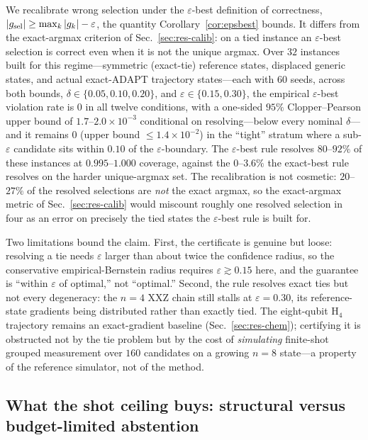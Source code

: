 \documentclass[aps,pra,reprint,superscriptaddress,nofootinbib,floatfix]{revtex4-2}
\begin{document}
We recalibrate wrong selection under the $\varepsilon$-best definition of correctness, $|g_{\rm sel}|\ge\max_k|g_k|-\varepsilon$, the quantity Corollary~\ref{cor:epsbest} bounds. It differs from the exact-argmax criterion of Sec.~\ref{sec:res-calib}: on a tied instance an $\varepsilon$-best selection is correct even when it is not the unique argmax. Over $32$ instances built for this regime---symmetric (exact-tie) reference states, displaced generic states, and actual exact-ADAPT trajectory states---each with $60$ seeds, across both bounds, $\delta\in\{0.05,0.10,0.20\}$, and $\varepsilon\in\{0.15,0.30\}$, the empirical $\varepsilon$-best violation rate is $0$ in all twelve conditions, with a one-sided $95\%$ Clopper--Pearson upper bound of $1.7$--$2.0\times10^{-3}$ conditional on resolving---below every nominal $\delta$---and it remains $0$ (upper bound $\le1.4\times10^{-2}$) in the ``tight'' stratum where a sub-$\varepsilon$ candidate sits within $0.10$ of the $\varepsilon$-boundary. The $\varepsilon$-best rule resolves $80$--$92\%$ of these instances at $0.995$--$1.000$ coverage, against the $0$--$3.6\%$ the exact-best rule resolves on the harder unique-argmax set. The recalibration is not cosmetic: $20$--$27\%$ of the resolved selections are \emph{not} the exact argmax, so the exact-argmax metric of Sec.~\ref{sec:res-calib} would miscount roughly one resolved selection in four as an error on precisely the tied states the $\varepsilon$-best rule is built for.

Two limitations bound the claim. First, the certificate is genuine but loose: resolving a tie needs $\varepsilon$ larger than about twice the confidence radius, so the conservative empirical-Bernstein radius requires $\varepsilon\gtrsim0.15$ here, and the guarantee is ``within $\varepsilon$ of optimal,'' not ``optimal.'' Second, the rule resolves exact ties but not every degeneracy: the $n=4$ XXZ chain still stalls at $\varepsilon=0.30$, its reference-state gradients being distributed rather than exactly tied. The eight-qubit H$_4$ trajectory remains an exact-gradient baseline (Sec.~\ref{sec:res-chem}); certifying it is obstructed not by the tie problem but by the cost of \emph{simulating} finite-shot grouped measurement over $160$ candidates on a growing $n=8$ state---a property of the reference simulator, not of the method.

\subsection{What the shot ceiling buys: structural versus budget-limited abstention}
\label{sec:res-ceiling}
\end{document}
